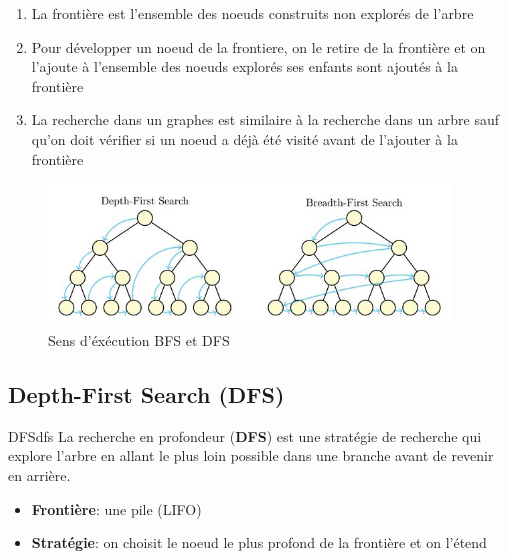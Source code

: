 \begin{remarks}\leavevmode
\begin{enumerate}
    \item La frontière est l'ensemble des noeuds construits non explorés de l'arbre
    \item Pour développer un noeud de la frontiere, on le retire de la frontière et on l'ajoute à l'ensemble des noeuds explorés
        ses enfants sont ajoutés à la frontière
    \item La recherche dans un graphes est similaire à la recherche dans un arbre sauf qu'on doit vérifier si un noeud a déjà été visité
        avant de l'ajouter à la frontière
\end{enumerate}
\end{remarks}



\begin{figure}[H]
    \begin{center}
        \includegraphics[width=0.95\textwidth]{./pictures/bfsschema.jpg}
    \end{center}
    \caption{Sens d'éxécution BFS et DFS}\label{fig:bfsschema}
\end{figure}



\subsection{Depth-First Search (DFS)} %
\label{sub:dfs}

\begin{definition}{DFS}{dfs}
    La recherche en profondeur (\textbf{DFS}) est une stratégie de recherche qui explore l'arbre en allant le plus loin possible dans une branche avant de revenir en arrière. 
    \begin{itemize}
        \item \textbf{Frontière}: une pile (LIFO)
        \item \textbf{Stratégie}: on choisit le noeud le plus profond de la frontière et on l'étend
    \end{itemize} 
\end{definition}

